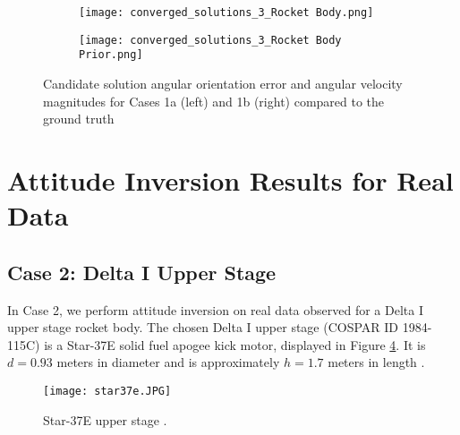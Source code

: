\documentclass[a4paper,twocolumn]{spaceDebrisC} %
\newcommand{\figsmall}[0]{0.3\textwidth}
\begin{document}
\begin{figure}[H]
  \centering
  \begin{subfigure}[t]{0.23\textwidth}
    \centering
    \texttt{[image: converged\_solutions\_3\_Rocket Body.png]}
    \caption{}
    \label{fig:w_vs_ang_error_sols1a}
  \end{subfigure}
  \hfill
  \begin{subfigure}[t]{0.23\textwidth}
    \centering
    \texttt{[image: converged\_solutions\_3\_Rocket Body Prior.png]}
    \caption{}
    \label{fig:w_vs_ang_error_sols1b}
  \end{subfigure}

  \caption{Candidate solution angular orientation error and angular velocity magnitudes for Cases 1a (left) and 1b (right) compared to the ground truth}
  \label{fig:w_vs_ang_error_sols1}
\end{figure}



\section{Attitude Inversion Results for Real Data} \label{sec:real_results}


\subsection{Case 2: Delta I Upper Stage}

In Case 2, we perform attitude inversion on real data observed for a Delta I upper stage rocket body. The chosen Delta I upper stage (COSPAR ID 1984-115C) is a Star-37E \cite{delta3914_astronautix} solid fuel apogee kick motor, displayed in Figure \ref{fig:star37e}. It is $d=0.93$ meters in diameter and is approximately $h=1.7$ meters in length \cite{star37e_astronautix, star37_gunter}.

\begin{figure}[H]
  \centering
  \texttt{[image: star37e.JPG]}
  \caption{Star-37E upper stage \cite{star37_af}.}
  \label{fig:star37e}
\end{figure}
\end{document}
